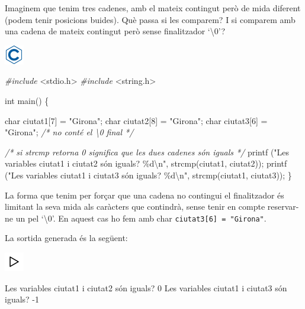 \documentclass[]{book}
\newenvironment{Shaded}{\begin{snugshade}}{\end{snugshade}}
\newcommand{\CommentTok}[1]{\textcolor[rgb]{0.56,0.35,0.01}{\textit{#1}}}
\newcommand{\DataTypeTok}[1]{\textcolor[rgb]{0.13,0.29,0.53}{#1}}
\newcommand{\DecValTok}[1]{\textcolor[rgb]{0.00,0.00,0.81}{#1}}
\newcommand{\ImportTok}[1]{#1}
\newcommand{\NormalTok}[1]{#1}
\newcommand{\PreprocessorTok}[1]{\textcolor[rgb]{0.56,0.35,0.01}{\textit{#1}}}
\newcommand{\SpecialCharTok}[1]{\textcolor[rgb]{0.00,0.00,0.00}{#1}}
\newcommand{\StringTok}[1]{\textcolor[rgb]{0.31,0.60,0.02}{#1}}
\begin{document}
Imaginem que tenim tres cadenes, amb el mateix contingut però de mida diferent (podem tenir posicions buides). Què passa si les comparem? I si comparem amb una cadena de mateix contingut però sense finalitzador `\textbackslash0'?

\includegraphics{./img/c.png}

\begin{Shaded}
\begin{Highlighting}[]
\PreprocessorTok{\#include }\ImportTok{\textless{}stdio.h\textgreater{}}
\PreprocessorTok{\#include }\ImportTok{\textless{}string.h\textgreater{}}

\DataTypeTok{int}\NormalTok{ main() \{}

    \DataTypeTok{char}\NormalTok{ ciutat1[}\DecValTok{7}\NormalTok{] = }\StringTok{"Girona"}\NormalTok{;}
    \DataTypeTok{char}\NormalTok{ ciutat2[}\DecValTok{8}\NormalTok{] = }\StringTok{"Girona"}\NormalTok{;}
    \DataTypeTok{char}\NormalTok{ ciutat3[}\DecValTok{6}\NormalTok{] = }\StringTok{"Girona"}\NormalTok{; }\CommentTok{/* no conté el \textquotesingle{}\textbackslash{}0\textquotesingle{} final */}

    \CommentTok{/* si strcmp retorna 0 significa que les dues cadenes són iguals */}
\NormalTok{    printf (}\StringTok{"Les variables ciutat1 i ciutat2 són iguals? \%d}\SpecialCharTok{\textbackslash{}n}\StringTok{"}\NormalTok{, strcmp(ciutat1, ciutat2));}
\NormalTok{    printf (}\StringTok{"Les variables ciutat1 i ciutat3 són iguals? \%d}\SpecialCharTok{\textbackslash{}n}\StringTok{"}\NormalTok{, strcmp(ciutat1, ciutat3));}
\NormalTok{\}}
\end{Highlighting}
\end{Shaded}

La forma que tenim per forçar que una cadena no contingui el finalitzador és limitant la seva mida als caràcters que contindrà, sense tenir en compte reservar-ne un pel `\textbackslash0'. En aquest cas ho fem amb char \texttt{ciutat3{[}6{]}\ =\ "Girona"}.

La sortida generada és la següent:

\includegraphics{./img/play.png}

\begin{Shaded}
\begin{Highlighting}[]
\NormalTok{Les variables ciutat1 i ciutat2 són iguals? }\DecValTok{0}
\NormalTok{Les variables ciutat1 i ciutat3 són iguals? {-}}\DecValTok{1}
\end{Highlighting}
\end{Shaded}
\end{document}
